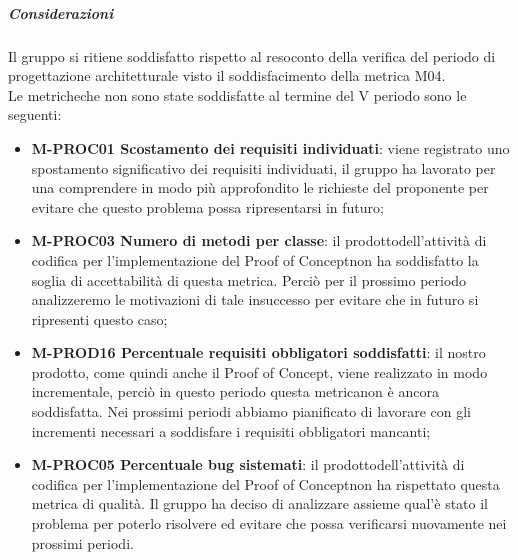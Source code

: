 \subparagraph{Considerazioni}
Il gruppo si ritiene soddisfatto rispetto al resoconto della verifica del periodo di progettazione architetturale visto il soddisfacimento della metrica M04. \\
Le metriche\glosp che non sono state soddisfatte al termine del V periodo sono le seguenti:
\begin{itemize}
	\item \textbf{M-PROC01 Scostamento dei requisiti individuati}: viene registrato uno spostamento significativo dei requisiti individuati, il gruppo ha lavorato per una comprendere in modo più approfondito le richieste del proponente per evitare che questo problema possa ripresentarsi in futuro;
	\item \textbf{M-PROC03 Numero di metodi per classe}: il prodotto\glosp dell'attività di codifica per l'implementazione del Proof of Concept\glosp non ha soddisfatto la soglia di accettabilità di questa metrica\glo. Perciò per il prossimo periodo analizzeremo le motivazioni di tale insuccesso per evitare che in futuro si ripresenti questo caso;
	\item \textbf{M-PROD16 Percentuale requisiti obbligatori soddisfatti}: il nostro prodotto\glo, come quindi anche il Proof of Concept\glo, viene realizzato in modo incrementale, perciò in questo periodo questa metrica\glosp non è ancora soddisfatta. Nei prossimi periodi abbiamo pianificato di lavorare con gli incrementi necessari a soddisfare i requisiti obbligatori mancanti;
	\item \textbf{M-PROC05 Percentuale bug sistemati}: il prodotto\glosp dell'attività di codifica per l'implementazione del Proof of Concept\glosp non ha rispettato questa metrica di qualità. Il gruppo ha deciso di analizzare assieme qual'è stato il problema per poterlo risolvere ed evitare che possa verificarsi nuovamente nei prossimi periodi.
\end{itemize}  

